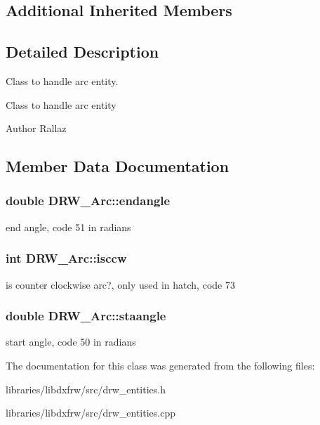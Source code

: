 \subsection*{Additional Inherited Members}


\subsection{Detailed Description}
Class to handle arc entity. 

Class to handle arc entity \begin{DoxyAuthor}{Author}
Rallaz 
\end{DoxyAuthor}


\subsection{Member Data Documentation}
\hypertarget{classDRW__Arc_a3425163b91e875fc7ffad0176e0e8183}{
\subsubsection[{endangle}]{\setlength{\rightskip}{0pt plus 5cm}double D\-R\-W\-\_\-\-Arc\-::endangle}}\label{classDRW__Arc_a3425163b91e875fc7ffad0176e0e8183}
end angle, code 51 in radians \hypertarget{classDRW__Arc_aaacaac1262bc3e4a2e83c13804d1cb00}{
\subsubsection[{isccw}]{\setlength{\rightskip}{0pt plus 5cm}int D\-R\-W\-\_\-\-Arc\-::isccw}}\label{classDRW__Arc_aaacaac1262bc3e4a2e83c13804d1cb00}
is counter clockwise arc?, only used in hatch, code 73 \hypertarget{classDRW__Arc_a7718d55eb1ddd3c4038be5798f37570e}{
\subsubsection[{staangle}]{\setlength{\rightskip}{0pt plus 5cm}double D\-R\-W\-\_\-\-Arc\-::staangle}}\label{classDRW__Arc_a7718d55eb1ddd3c4038be5798f37570e}
start angle, code 50 in radians 

The documentation for this class was generated from the following files\-:\begin{DoxyCompactItemize}
\item 
libraries/libdxfrw/src/drw\-\_\-entities.\-h\item 
libraries/libdxfrw/src/drw\-\_\-entities.\-cpp\end{DoxyCompactItemize}
